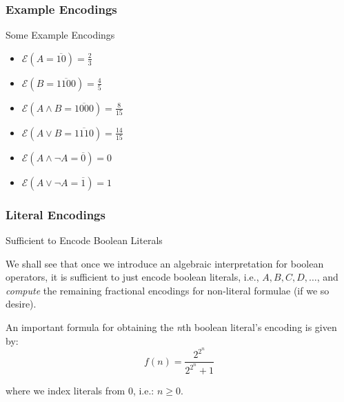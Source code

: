 \documentclass{beamer}
\begin{document}
\begin{frame}
\frametitle{Example Encodings}
\begin{exampleblock}
{Some Example Encodings}

\begin{itemize}
\item \(  \mathcal{E}(A  = \overline{10}) = \frac{2}{3} \)
\item \(  \mathcal{E}(B  = \overline{1100}) = \frac{4}{5} \)
\item \(  \mathcal{E}(A \land B  = \overline{1000} ) = \frac{8}{15}\)
\item \(  \mathcal{E}(A \lor B  = \overline{1110} ) = \frac{14}{15}\)
\item \(  \mathcal{E}(A \land \neg A  = \overline{0} ) = 0\)
\item \(  \mathcal{E}(A \lor \neg A  = \overline{1} ) = 1\)
\end{itemize}

\end{exampleblock}
\end{frame}

\begin{frame}
\frametitle{Literal Encodings}
\begin{block}
{Sufficient to Encode Boolean Literals}

We shall see that once we introduce an algebraic interpretation for boolean operators, it is sufficient to just encode boolean literals, i.e., \(A, B, C, D, \ldots\), and \emph{compute} the remaining fractional encodings for non-literal formulae (if we so desire).

An important formula for obtaining the \emph{n}th boolean literal's encoding is given by:
\[
f(n) = \frac{2^{2^n}}{2^{2^n} + 1}
\]

where we index literals from 0, i.e.: \(n \geq 0\).

\end{block}
\end{frame}
\end{document}
